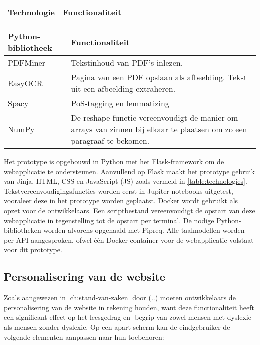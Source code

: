 \begin{center}
	\begin{tabular}{ | m{4cm} | m{12cm} | } 
		\hline
		\textbf{Technologie} & \textbf{Functionaliteit} \\
		\hline
		
		\hline
	\end{tabular}
	\label{table:technologies}
\end{center}


\begin{center}
	\begin{tabular}{ | m{4cm} | m{12cm} | } 
		\hline
		\textbf{Python-bibliotheek} & \textbf{Functionaliteit} \\
		\hline
		PDFMiner & Tekstinhoud van PDF's inlezen. \\ 
		EasyOCR	& Pagina van een PDF opslaan als afbeelding. Tekst uit een afbeelding extraheren. \\
		Spacy & PoS-tagging en lemmatizing \\
		NumPy & De reshape-functie vereenvoudigt de manier om arrays van zinnen bij elkaar te plaatsen om zo een paragraaf te bekomen. \\
		\hline
	\end{tabular}
	\label{table:python-libraries}
\end{center}

Het prototype is opgebouwd in Python met het Flask-framework om de webapplicatie te ondersteunen. Aanvullend op Flask maakt het prototype gebruik van Jinja, HTML, CSS en JavaScript (JS) zoals vermeld in \ref{table:technologies}. Tekstvereenvoudigingsfuncties worden eerst in Jupiter notebooks uitgetest, vooraleer deze in het prototype worden geplaatst. Docker wordt gebruikt als opzet voor de ontwikkelaars. Een scriptbestand vereenvoudigt de opstart van deze webapplicatie in tegenstelling tot de opstart per terminal. De nodige Python-bibliotheken worden alvorens opgehaald met Pipreq. Alle taalmodellen worden per API aangesproken, ofwel één Docker-container voor de webapplicatie volstaat voor dit prototype.


\subsection{Personalisering van de website}


Zoals aangewezen in \ref{ch:stand-van-zaken} door (..) moeten ontwikkelaars de personalisering van de website in rekening houden, want deze functionaliteit heeft een significant effect op het leesgedrag en -begrip van zowel mensen met dyslexie als mensen zonder dyslexie. Op een apart scherm kan de eindgebruiker de volgende elementen aanpassen naar hun toebehoren:

